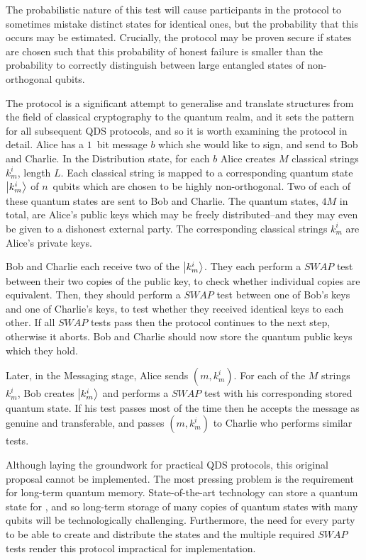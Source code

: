 The probabilistic nature of this test will cause participants in the protocol to sometimes mistake distinct states for identical ones, but the probability that this occurs may be estimated. Crucially, the protocol may be proven secure if states are chosen such that this probability of honest failure is smaller than the probability to correctly distinguish between large entangled states of non-orthogonal qubits. 

The protocol is a significant attempt to generalise and translate structures from the field of classical cryptography to the quantum realm, and it sets the pattern for all subsequent QDS protocols, and so it is worth examining the protocol in detail. Alice has a $1$~bit message $b$ which she would like to sign, and send to Bob and Charlie. In the Distribution state, for each $b$ Alice creates $M$ classical strings $k_m^i$, length $L$. Each classical string is mapped to a corresponding quantum state $\ket{k_m^i}$ of $n$~qubits which are chosen to be highly non-orthogonal. Two of each of these quantum states are sent to Bob and Charlie. The quantum states, $4M$ in total, are Alice's public keys which may be freely distributed--and they may even be given to a dishonest external party. The corresponding classical strings $k_m^i$ are Alice's private keys.

Bob and Charlie each receive two of the $\ket{k_m^i}$. They each perform a $SWAP$ test between their two copies of the public key, to check whether individual copies are equivalent. Then, they should perform a $SWAP$ test between one of Bob's keys and one of Charlie's keys, to test whether they received identical keys to each other. If all $SWAP$ tests pass then the protocol continues to the next step, otherwise it aborts. Bob and Charlie should now store the quantum public keys which they hold.

Later, in the Messaging stage, Alice sends $\left(m, k_m^i\right)$. For each of the $M$ strings $k_m^i$, Bob creates $\ket{k_m^i}$ and performs a $SWAP$ test with his corresponding stored quantum state. If his test passes most of the time then he accepts the message as genuine and transferable, and passes $\left(m, k_m^i\right)$ to Charlie who performs similar tests. 

Although laying the groundwork for practical QDS protocols, this original proposal cannot be implemented. The most pressing problem is the requirement for long-term quantum memory. State-of-the-art technology can store a quantum state for , and so long-term storage of many copies of quantum states with many qubits will be technologically challenging. Furthermore, the need for every party to be able to create and distribute the states and the multiple required $SWAP$ tests render this protocol impractical for implementation. 

